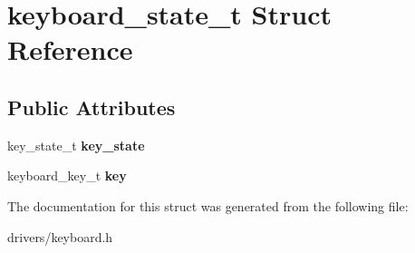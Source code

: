 \hypertarget{structkeyboard__state__t}{}\section{keyboard\+\_\+state\+\_\+t Struct Reference}
\label{structkeyboard__state__t}
\subsection*{Public Attributes}
\begin{DoxyCompactItemize}
\item 
key\+\_\+state\+\_\+t {\bfseries key\+\_\+state}\hypertarget{structkeyboard__state__t_af2d23d510e9eb0ba51c52cb880cd9305}{}\label{structkeyboard__state__t_af2d23d510e9eb0ba51c52cb880cd9305}

\item 
keyboard\+\_\+key\+\_\+t {\bfseries key}\hypertarget{structkeyboard__state__t_a18bf5ce0351f880eee4faca59da05d3b}{}\label{structkeyboard__state__t_a18bf5ce0351f880eee4faca59da05d3b}

\end{DoxyCompactItemize}


The documentation for this struct was generated from the following file\+:\begin{DoxyCompactItemize}
\item 
drivers/keyboard.\+h\end{DoxyCompactItemize}
